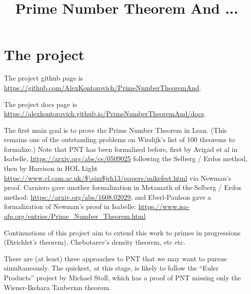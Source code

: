 

\usepackage{amsmath, amsthm}
\usepackage{hyperref}

\theoremstyle{definition}
\newtheorem{definition}{Definition}[section]
\newtheorem{theorem}{Theorem}[section]
\newtheorem{proposition}{Proposition}[section]
\newtheorem{lemma}{Lemma}[section]
\newtheorem{sublemma}{Sublemma}[section]
\newtheorem{corollary}{Corollary}[section]
\newtheorem{remark}{Remark}[section]

\title{Prime Number Theorem And ...}

\newcommand{\eps}{\varepsilon}

\newcommand{\R}{\mathbb{R}}
\newcommand{\Q}{\mathbb{Q}}
\newcommand{\C}{\mathbb{C}}
\newcommand{\Z}{\mathbb{Z}}
\newcommand{\N}{\mathbb{N}}
\newcommand{\li}{\operatorname{li}}
\newcommand{\Li}{\operatorname{Li}}


\maketitle

\chapter{The project}

The project github page is \url{https://github.com/AlexKontorovich/PrimeNumberTheoremAnd}.

The project docs page is \url{https://alexkontorovich.github.io/PrimeNumberTheoremAnd/docs}.

The first main goal is to prove the Prime Number Theorem in Lean.
(This remains one of the outstanding problems on Wiedijk's list of 100 theorems to formalize.)
Note that PNT has been formalized before, first by Avigad et al in Isabelle,
\url{https://arxiv.org/abs/cs/0509025}
following the Selberg / Erdos method, then
by Harrison in HOL Light
\url{https://www.cl.cam.ac.uk/$\sim$jrh13/papers/mikefest.html}
via Newman's proof.
Carniero gave another formalization in Metamath of the Selberg / Erdos method:
\url{https://arxiv.org/abs/1608.02029},
and Eberl-Paulson gave a formalization of Newman's proof in Isabelle:
\url{https://www.isa-afp.org/entries/Prime\_Number\_Theorem.html}

Continuations of this project aim to extend
this work to primes in progressions (Dirichlet's theorem), Chebotarev's density theorem, etc
etc.

There are (at least) three approaches to PNT that we may want to pursue simultaneously. The quickest, at this stage, is likely to
follow
 the ``Euler Products'' project by Michael Stoll, which has a proof of PNT missing only the Wiener-Ikehara Tauberian theorem.

